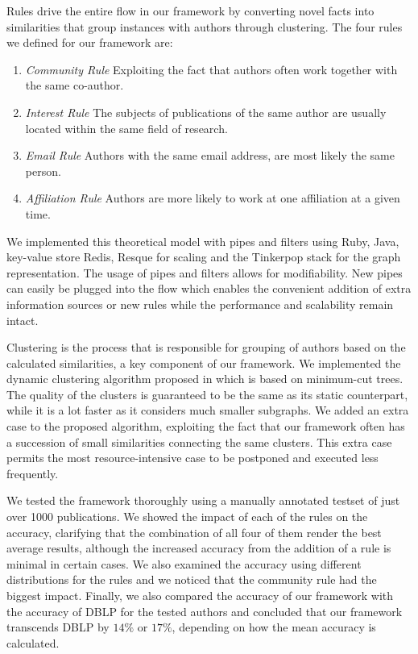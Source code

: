 Rules drive the entire flow in our framework by converting novel facts into similarities that group instances with authors through clustering. The four rules we defined for our framework are:

\begin{enumerate}
	\item \textit{Community Rule} Exploiting the fact that authors often work together with the same co-author.
	\item \textit{Interest Rule} The subjects of publications of the same author are usually located within the same field of research.
	\item \textit{Email Rule} Authors with the same email address, are most likely the same person.
	\item \textit{Affiliation Rule} Authors are more likely to work at one affiliation at a given time.
\end{enumerate}

We implemented this theoretical model with pipes and filters using Ruby, Java, key-value store Redis, Resque for scaling and the Tinkerpop stack for the graph representation. The usage of pipes and filters allows for modifiability. New pipes can easily be plugged into the flow which enables the convenient addition of extra information sources or new rules while the performance and scalability remain intact.

Clustering is the process that is responsible for grouping of authors based on the calculated similarities, a key component of our framework. We implemented the dynamic clustering algorithm proposed in \cite{saha2006dynamic} which is based on minimum-cut trees. The quality of the clusters is guaranteed to be the same as its static counterpart, while it is a lot faster as it considers much smaller subgraphs. We added an extra case to the proposed algorithm, exploiting the fact that our framework often has a succession of small similarities connecting the same clusters. This extra case permits the most resource-intensive case to be postponed and executed less frequently.



We tested the framework thoroughly using a manually annotated testset of just over 1000 publications. We showed the impact of each of the rules on the accuracy, clarifying that the combination of all four of them render the best average results, although the increased accuracy from the addition of a rule is minimal in certain cases. We also examined the accuracy using different distributions for the rules and we noticed that the community rule had the biggest impact. Finally, we also compared the accuracy of our framework with the accuracy of DBLP for the tested authors and concluded that our framework transcends DBLP by $14\%$ or $17\%$, depending on how the mean accuracy is calculated.

